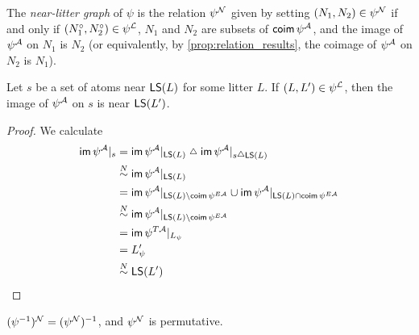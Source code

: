 \begin{definition}
  \label{def:nearLitterGraph}
  \leanok
  The \emph{near-litter graph} of \( \psi \) is the relation \( \psi^{\mathcal N} \) given by setting \( (N_1, N_2) \in \psi^{\mathcal N} \) if and only if \( (N_1^\circ, N_2^\circ) \in \psi^{\mathcal L} \), \( N_1 \) and \( N_2 \) are subsets of \( \operatorname{\mathsf{coim}} \psi^{\mathcal A} \), and the image of \( \psi^{\mathcal A} \) on \( N_1 \) is \( N_2 \) (or equivalently, by \cref{prop:relation_results}, the coimage of \( \psi^{\mathcal A} \) on \( N_2 \) is \( N_1 \)).
\end{definition}
\begin{proposition}
  \label{prop:approx_near}
  \leanok
  Let \( s \) be a set of atoms near \( \operatorname{\mathsf{LS}}(L) \) for some litter \( L \).
  If \( (L, L') \in \psi^{\mathcal L} \), then the image of \( \psi^{\mathcal A} \) on \( s \) is near \( \operatorname{\mathsf{LS}}(L') \).
\end{proposition}
\begin{proof}
  \leanok
  We calculate
  \begin{align*}
    \im \psi^\Atom|_s
    &= \im \psi^\Atom|_{\LS(L)} \symmdiff \im \psi^\Atom|_{s \symmdiff \LS(L)} \\
    &\near \im \psi^\Atom|_{\LS(L)} \\
    &= \im \psi^\Atom|_{\LS(L) \setminus \coim \psi^{E\Atom}} \cup \im \psi^\Atom|_{\LS(L) \cap \coim \psi^{E\Atom}} \\
    &\near \im \psi^\Atom|_{\LS(L) \setminus \coim \psi^{E\Atom}} \\
    &= \im \psi^{T\Atom}|_{L_\psi} \\
    &= L'_\psi \\
    &\near \LS(L')
  \end{align*}
\end{proof}
\begin{proposition}
  \label{prop:nearLitterGraph_permutative}
  \leanok
  \( (\psi^{-1})^{\mathcal N} = (\psi^{\mathcal N})^{-1} \), and \( \psi^{\mathcal N} \) is permutative.
\end{proposition}
